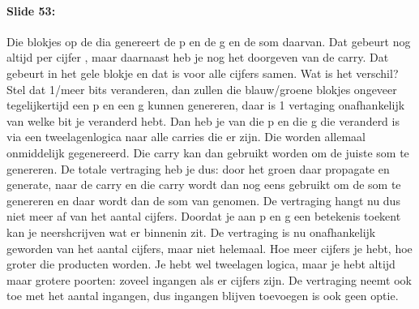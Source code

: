 \documentclass[10pt,a4paper]{book}
\begin{document}
\paragraph{Slide 53:} Die blokjes op de dia genereert de p en de g en de som daarvan. Dat gebeurt nog altijd per cijfer , maar daarnaast heb je nog het doorgeven van de carry. Dat gebeurt in het gele blokje en dat is voor alle cijfers samen. Wat is het verschil? Stel dat 1/meer bits veranderen, dan zullen die blauw/groene blokjes ongeveer tegelijkertijd een p en een g kunnen genereren, daar is 1 vertaging onafhankelijk van welke bit je veranderd hebt. Dan heb je van die p en die g die veranderd is via een tweelagenlogica naar alle carries die er zijn. Die worden allemaal onmiddelijk gegenereerd. Die carry kan dan gebruikt worden om de juiste som te genereren. De totale vertraging heb je dus: door het groen daar propagate en generate, naar de carry en die carry wordt dan nog eens gebruikt om de som te genereren en daar wordt dan de som van genomen. De vertraging hangt nu dus niet meer af van het aantal cijfers. Doordat je aan p en g een betekenis toekent kan je neershcrijven wat er binnenin zit. De vertraging is nu onafhankelijk geworden van het aantal cijfers, maar niet helemaal. Hoe meer cijfers je hebt, hoe groter die producten worden. Je hebt wel tweelagen logica, maar je hebt altijd maar grotere poorten: zoveel ingangen als er cijfers zijn. De vertraging neemt ook toe met het aantal ingangen, dus ingangen blijven toevoegen is ook geen optie.
\end{document}
